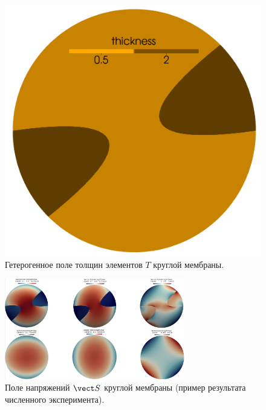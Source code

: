   \begin{figure}[H]
    \centering
    \includegraphics[width=0.25\linewidth]{img/het_circle.png}
    \caption{Гетерогенное поле толщин элементов $T$ круглой мембраны.}
    \label{fig:membrane_thickness}
  \end{figure}

  \begin{figure}[H]
    \centering
    \includegraphics[width=0.7\textwidth]{img/Numerical/ref_stress.png}
    \caption{Поле напряжений $\vect S$ круглой мембраны (пример результата численного эксперимента).}
    \label{fig:numerical_experiment}
  \end{figure}
  
